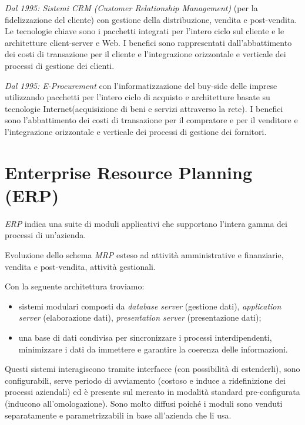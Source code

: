 \documentclass[a4paper, notitlepage, 9pt]{extreport}
\begin{document}
\noindent
\textit{Dal 1995: Sistemi CRM (Customer Relationship Management)} (per la fidelizzazione del cliente) con gestione della distribuzione, vendita e post-vendita. Le tecnologie chiave sono i pacchetti integrati per l’intero ciclo sul cliente e le architetture client-server e Web. I benefici sono rappresentati dall'abbattimento dei costi di transazione per il cliente e l'integrazione orizzontale e verticale dei processi di gestione dei clienti.
\newline

\noindent
\textit{Dal 1995: E-Procurement} con l'informatizzazione del buy-side delle imprese utilizzando pacchetti per l’intero ciclo di acquisto e architetture basate su tecnologie Internet(acquisizione di beni e servizi attraverso la rete). I benefici sono l'abbattimento dei costi di transazione per il compratore e per il venditore e l'integrazione orizzontale e verticale dei processi di gestione dei fornitori.


\section*{Enterprise Resource Planning (ERP)}
\textit{ERP} indica una suite di moduli applicativi che supportano l’intera gamma dei processi di un’azienda.

\noindent
Evoluzione dello schema \textit{MRP} esteso ad attività amministrative e finanziarie, vendita e post-vendita, attività gestionali.

\noindent
Con la seguente architettura troviamo:
\begin{itemize}
	\item sistemi modulari composti da \textit{database server} (gestione dati), \textit{application server} (elaborazione dati), \textit{presentation server} (presentazione dati);
	\item una base di dati condivisa per sincronizzare i processi interdipendenti, minimizzare i dati da immettere e garantire la coerenza delle informazioni.
\end{itemize}
Questi sistemi interagiscono tramite interfacce (con possibilità di estenderli), sono configurabili, serve periodo di avviamento (costoso e induce a ridefinizione dei processi aziendali) ed è presente sul mercato in modalità standard pre-configurata (inducono all'omologazione). Sono molto diffusi poiché i moduli sono venduti separatamente e parametrizzabili in base all'azienda che li usa.
\end{document}
